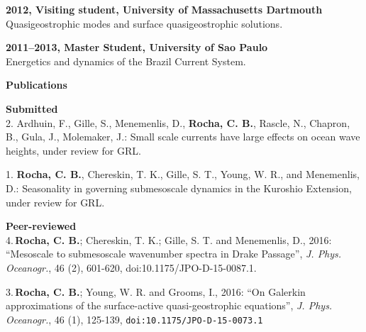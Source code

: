 \documentclass[a4paper,11pt,final]{memoir}
\newcommand{\Sep}{\vspace{1.25em}}
\newcommand{\SmallSep}{\vspace{0.5em}}
\newcommand{\CVSection}[1]
    {\Large\textbf{#1}\par
    \SmallSep\normalsize\normalfont}
\newcommand{\CVItem}[1]
    {\textbf{\color{NavyBlue} #1}}
\begin{document}
\CVItem{2012, Visiting student, University of Massachusetts Dartmouth}\\
Quasigeostrophic modes and surface quasigeostrophic solutions.
\SmallSep

\CVItem{2011--2013, Master Student, University of Sao Paulo}\\
Energetics and dynamics of the Brazil Current System.


\Sep

\CVSection{Publications}

\CVItem{Submitted }\\






2. Ardhuin, F., Gille, S., Menemenlis, D., \textbf{Rocha, C. B.}, Rascle, N., Chapron, B., Gula, J., Molemaker, J.: Small scale currents have large effects on ocean wave heights, under review for GRL.

\SmallSep

1.  \textbf{Rocha, C. B.}, Chereskin, T. K., Gille, S. T., Young, W. R., and Menemenlis, D.: Seasonality in governing submesoscale dynamics in the Kuroshio Extension, under review for GRL. 

\SmallSep

\CVItem{Peer-reviewed}\\

4.\,\textbf{Rocha, C. B.};  Chereskin, T. K.; Gille, S. T. and Menemenlis, D., 2016: ``Mesoscale to submesoscale wavenumber spectra in Drake Passage'', \textit{J. Phys. Oceanogr.}, 46 (2), 601-620, doi:10.1175/JPO-D-15-0087.1. 

\SmallSep

3.\,\textbf{Rocha, C. B.};  Young, W. R. and Grooms, I., 2016: ``On Galerkin approximations of the surface-active quasi-geostrophic equations'', \textit{J. Phys. Oceanogr.}, 46 (1), 125-139, \texttt{doi:10.1175/JPO-D-15-0073.1} 
\end{document}
